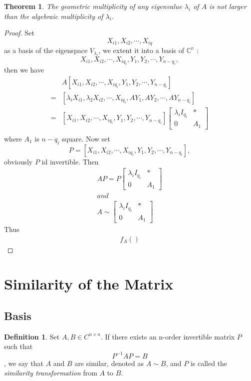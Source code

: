 \documentclass{article}
\newtheorem{theorem}{Theorem}[section]
\theoremstyle{definition}
\newtheorem{defi}{Definition}[section]
\begin{document}
\begin{theorem}
The geometric multiplicity of any eigenvalue $\lambda_{i}$ of $A$ is not larger than the algebraic multiplicity of $\lambda_{i}$.
\end{theorem}
\begin{proof}
    Set $$X_{i1},X_{i2},\cdots,X_{iq}$$
    as a basis of the eigenspace $V_{\lambda_{i}}$, we extent it into a basis of $\mathbb{C^{n}}$ :
    $$X_{i1},X_{i2},\cdots,X_{iq_{i}},Y_{1},Y_{2},\cdots,Y_{n-q_{i}},$$
    then we have 
    \begin{align*}
        &A[X_{i1},X_{i2},\cdots,X_{iq_{i}},Y_{1},Y_{2},\cdots,Y_{n-q_{i}}]\\
        =&[\lambda_{i}X_{i1},\lambda_{2}X_{i2},\cdots,X_{iq_{i}},AY_{1},AY_{2},\cdots,AY_{n-q_{i}}]\\
        =&[X_{i1},X_{i2},\cdots,X_{iq_{i}},Y_{1},Y_{2},\cdots,Y_{n-q_{i}}]\begin{bmatrix}
            \lambda_{i}I_{q_{i}}&*\\0&A_{1}\end{bmatrix}\\
    \end{align*}
    where $A_{1}$ is $n-q_{i}$ square. Now set $$P=[X_{i1},X_{i2},\cdots,X_{iq_{i}},Y_{1},Y_{2},\cdots,Y_{n-q_{i}}],$$ 
    obviously $P$ id invertible. Then 
    \begin{align*}
        AP=P\begin{bmatrix}
            \lambda_{i}I_{q_{i}}&*\\0&A_{1}\end{bmatrix}\\
        and\\
        A\sim\begin{bmatrix}
            \lambda_{i}I_{q_{i}}&*\\0&A_{1}\end{bmatrix}
    \end{align*}
    Thus
    \begin{align*}
        f_{A}()
    \end{align*}

\end{proof}


\section{Similarity of the Matrix}
\subsection{Basis}
\begin{defi}
    Set $A,B\in C^{n\times n}$. If there exists
    an n-order invertible matrix $P$ such that 
    $$P^{-1}AP=B$$, we say that $A$ and $B$ are similar,
    denoted as $A\sim B$, and $P$ is called the 
    \textit{similarity transformation} from $A$ to $B$. 
\end{defi}
\end{document}
